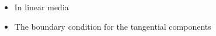 \begin{ELjoin}

\begin{itemize}
\tightlist
\item
  In linear media
\end{itemize}

\begin{ELimportant}{}


\end{ELimportant}

\end{ELjoin}

\begin{ELunit}

\begin{itemize}
\tightlist
\item
  The boundary condition for the tangential components
\end{itemize}



\end{ELunit}

\begin{ELimportant}{}


\end{ELimportant}

\ELhold


